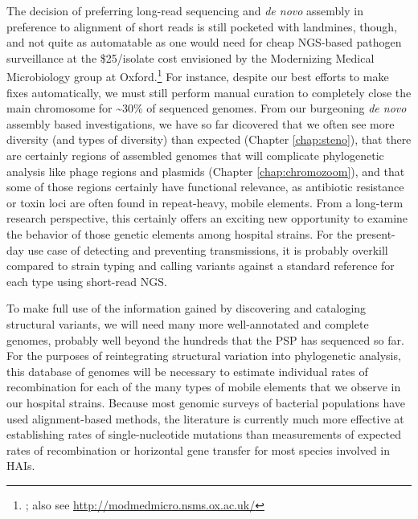 The decision of preferring long-read sequencing and \emph{de novo} assembly in preference to alignment of short reads is still pocketed with landmines, though, and not quite as automatable as one would need for cheap NGS-based pathogen surveillance at the \$25/isolate cost envisioned by the Modernizing Medical Microbiology group at Oxford.\footnote{\textcite{Koser2012}; also see \url{http://modmedmicro.nsms.ox.ac.uk/}} For instance, despite our best efforts to make fixes automatically, we must still perform manual curation to completely close the main chromosome for \textasciitilde 30\% of sequenced genomes. From our burgeoning \emph{de novo} assembly based investigations, we have so far dicovered that we often see more diversity (and types of diversity) than expected (Chapter \ref{chap:steno}), that there are certainly regions of assembled genomes that will complicate phylogenetic analysis like phage regions and plasmids (Chapter \ref{chap:chromozoom}), and that some of those regions certainly have functional relevance, as antibiotic resistance or toxin loci are often found in repeat-heavy, mobile elements.\autocite{Knight2015,Casas2006,Chen2014} From a long-term research perspective, this certainly offers an exciting new opportunity to examine the behavior of those genetic elements among hospital strains. For the present-day use case of detecting and preventing transmissions, it is probably overkill compared to strain typing and calling variants against a standard reference for each type using short-read NGS.

To make full use of the information gained by discovering and cataloging structural variants, we will need many more well-annotated and complete genomes, probably well beyond the hundreds that the PSP has sequenced so far. For the purposes of reintegrating structural variation into phylogenetic analysis, this database of genomes will be necessary to estimate individual rates of recombination for each of the many types of mobile elements that we observe in our hospital strains. Because most genomic surveys of bacterial populations have used alignment-based methods, the literature is currently much more effective at establishing rates of single-nucleotide mutations than measurements of expected rates of recombination or horizontal gene transfer for most species involved in HAIs.

